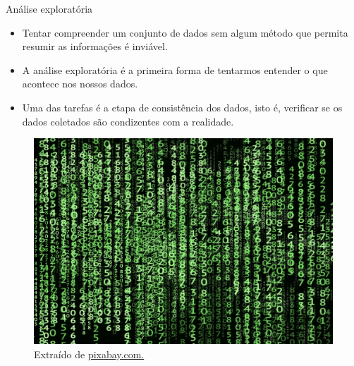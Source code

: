 \documentclass[
  ignorenonframetext,
  serif,
  professionalfont,
  usenames,
  dvipsnames,
  aspectratio = 169]{beamer}
\providecommand{\tightlist}{%
  \setlength{\itemsep}{0pt}\setlength{\parskip}{0pt}}
\renewcommand{\tightlist}{%
  \setlength{\itemsep}{0\baselineskip}
  \setlength{\parskip}{0.25\baselineskip}
}
\def\beginAHalfColumn{\begin{minipage}{0.49\textwidth}}%
\def\endColumns{\end{minipage}}%
\begin{document}
\begin{frame}{Análise exploratória}
\label{anuxe1lise-exploratuxf3ria-3}
\beginAHalfColumn

\begin{itemize}
\tightlist
\item
  Tentar compreender um conjunto de dados sem algum método que permita
  resumir as informações é inviável.
\end{itemize}

\vspace{0.3cm}

\begin{itemize}
\tightlist
\item
  A análise exploratória é a primeira forma de tentarmos entender o que
  acontece nos nossos dados.
\end{itemize}

\vspace{0.3cm}

\begin{itemize}
\tightlist
\item
  Uma das tarefas é a etapa de consistência dos dados, isto é, verificar
  se os dados coletados são condizentes com a realidade.
\end{itemize}

\endColumns
\beginAHalfColumn

\begin{figure}

{\centering \includegraphics[width=0.9\linewidth]{./img/dados} 

}

\caption{Extraído de \href{https://cdn.pixabay.com/photo/2018/01/26/18/21/matrix-3109378_1280.jpg}{pixabay.com.}}\label{fig:unnamed-chunk-3}
\end{figure}

\endColumns
\end{frame}
\end{document}
